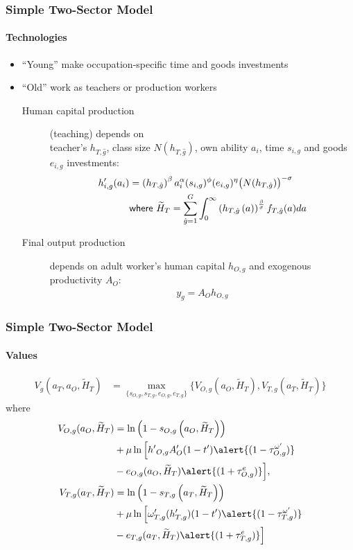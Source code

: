 \documentclass[11pt]{beamer}
\begin{document}
	\begin{frame}
		\frametitle{Simple Two-Sector Model}
		\framesubtitle{Technologies}
		\begin{itemize}
			\item ``Young'' make occupation-specific time and goods investments
			\item ``Old'' work as \alert{teachers} or \alert{production workers}
			\begin{description}
				\item[Human capital production] (teaching) depends on\\
				teacher's $h_{T,\hat{g}}$, class size $N(h_{T,\hat{g}})$,  own ability $a_i$, time $s_{i,g}$ and goods $e_{i,g}$ investments:
				\begin{align*}
					\label{}
					h'_{i,g}(a_i) & =\left( h_{T,\hat{g}}\right)^\beta a_i^\alpha(s_{i,g})^{\phi} (e_{i,g})^{\eta}\big(N(h_{T,\hat{g}})\big)^{-\sigma}\\
					& \textrm{{\sf where }} \widetilde{H}_T =\sum_{\hat{g}=1}^G \int_0^\infty \left( h_{T,\hat{g}}\left( a \right) \right)^{\frac{\beta}{\sigma}} f_{T,\hat{g}}(a) da
				\end{align*}
				\item[Final output production] depends on adult worker's human capital $h_{O,g}$ and exogenous productivity $A_O$:
				\begin{align*}
					\label{}
					y_g = A_O h_{O,g}
				\end{align*}
			\end{description}
		\end{itemize}
	\end{frame}
	
	
	\begin{frame}
		\frametitle{Simple Two-Sector Model}
		\framesubtitle{Values}
		\begin{align*}
			\label{}
			V_g(a_T,a_O,\widetilde{H}_T) & = \max_{\{s_{O,g},s_{T,g},e_{O,g},e_{T,g}\}} \bigg\{ V_{O,g}(a_O,\widetilde{H}_T), V_{T,g}(a_T,\widetilde{H}_T) \bigg\} \label{eq:V}
		\end{align*}
		where
		\begin{align*}
			V_{O,g}(a_O,\widetilde{H}_T) & = \ln\left(1-s_{O,g}\left(a_O,\widetilde{H}_T\right)\right) \nonumber \\
			& + \mu \ln \Big[ {{h'}_{O,g}} A_O'(1-t')\alert{(1-\tau^{\omega '}_{O,g})} \nonumber \\
			& - e_{O,g}(a_O,\widetilde{H}_T)\alert{(1+\tau^e_{O,g})} \Big],\\
			V_{T,g}(a_T,\widetilde{H}_T) & = \ln\left(1-s_{T,g}\left(a_T,\widetilde{H}_T\right)\right) \nonumber \\
			& + \mu \ln \Big[ \omega_{T,g}'({h_{T,g}'})(1-t')\alert{(1-\tau^{\omega '}_{T,g}) }\nonumber \\
			& - e_{T,g}(a_T,\widetilde{H}_T)\alert{(1+\tau^{e }_{T,g})} \Big] 
		\end{align*}
	\end{frame}
	
\end{document}
